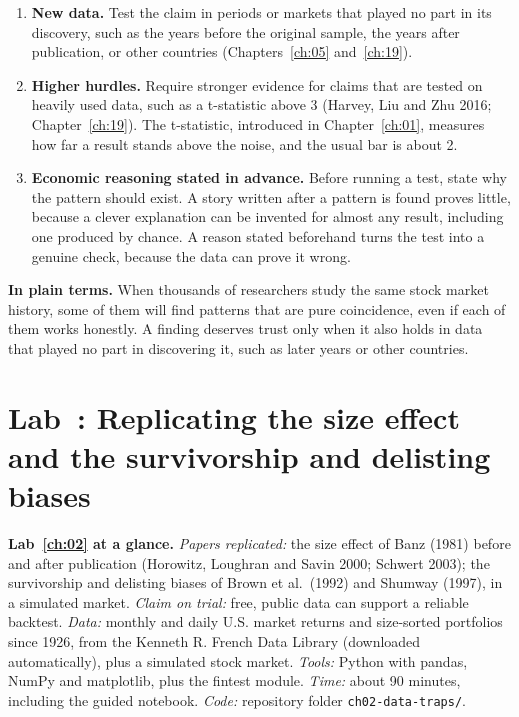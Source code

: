 \begin{enumerate}
  \item \textbf{New data.} Test the claim in periods or markets that played no part in its discovery, such as the years before the original sample, the years after publication, or other countries (Chapters~\ref{ch:05} and~\ref{ch:19}).
  \item \textbf{Higher hurdles.} Require stronger evidence for claims that are tested on heavily used data, such as a t-statistic above 3 (Harvey, Liu and Zhu 2016; Chapter~\ref{ch:19}). The t-statistic, introduced in Chapter~\ref{ch:01}, measures how far a result stands above the noise, and the usual bar is about 2.
    \item \textbf{Economic reasoning stated in advance.} Before running a test, state why the pattern should exist. A story written after a pattern is found proves little, because a clever explanation can be invented for almost any result, including one produced by chance. A reason stated beforehand turns the test into a genuine check, because the data can prove it wrong.
\end{enumerate}

\noindent\textbf{In plain terms.} When thousands of researchers study the same stock market history, some of them will find patterns that are pure coincidence, even if each of them works honestly. A finding deserves trust only when it also holds in data that played no part in discovering it, such as later years or other countries.

\section{Lab~\thechapter: Replicating the size effect and the survivorship and delisting biases}
\label{sec:02-lab}

\begin{callout}
\textbf{Lab~\ref{ch:02} at a glance.} \emph{Papers replicated:} the size effect of Banz (1981) before and after publication (Horowitz, Loughran and Savin 2000; Schwert 2003); the survivorship and delisting biases of Brown et al.\ (1992) and Shumway (1997), in a simulated market. \emph{Claim on trial:} free, public data can support a reliable backtest. \emph{Data:} monthly and daily U.S. market returns and size-sorted portfolios since 1926, from the Kenneth R. French Data Library (downloaded automatically), plus a simulated stock market. \emph{Tools:} Python with pandas, NumPy and matplotlib, plus the fintest module. \emph{Time:} about 90 minutes, including the guided notebook. \emph{Code:} repository folder \texttt{ch02-data-traps/}.
\end{callout}

